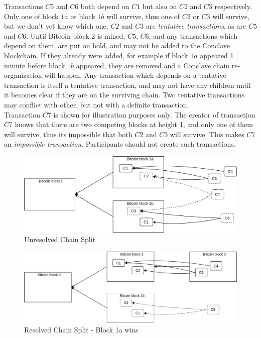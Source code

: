\documentclass{report}
\begin{document}
		Transactions $C5$ and $C6$ both depend on $C1$ but also on $C2$ and $C3$ respectively. Only one of block $1a$ or block $1b$ will survive, thus one of $C2$ or $C3$ will survive, but we don't yet know which one. $C2$ and $C3$ are \textit{tentative transactions},  as are $C5$ and $C6$. Until Bitcoin block 2 is mined, $C5$, $C6$, and any transactions which depend on them, are put on hold, and may not be added to the Conclave blockchain. If they already were added, for example if block $1a$ appeared 1 minute before block $1b$ appeared, they are removed and a Conclave chain re-organization  will happen. Any transaction which depends on a tentative transaction is itself a tentative transaction, and may not have any children until it becomes clear if they are on the surviving chain. Two tentative transactions may conflict with other, but not with a definite transaction.\\
		
		Transaction $C7$ is shown for illustration purposes only. The creator of transaction $C7$ knows that there are two competing blocks at height 1, and only one of them will survive, thus its impossible that both $C2$ and $C3$ will survive. This makes $C7$ an \textit{impossible transaction}.  Participants should not create such transactions.
		
		
			\begin{figure}[H]
				\begin{center}
					\includegraphics[width=350pt]{img/Chain-Split-1.png}
				\end{center}
				\caption{Unresolved Chain Split}
				\label{fig:ucSplit1}
			\end{figure}
			
			\begin{figure}[H]
				\begin{center}
					\includegraphics[width=350pt]{img/Chain-Split-2.png}
				\end{center}
				\caption{Resolved Chain Split - Block 1a wins}
				\label{fig:ucSplit2}
			\end{figure}
		
\end{document}
